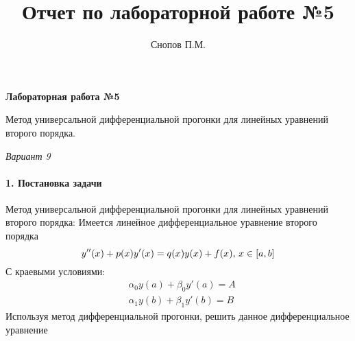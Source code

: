 \documentclass[11pt,a4paper]{report}
\begin{document}
\lstset{
	language=Python,
	tabsize=2,
	showspaces=false,
	showstringspaces=false,
	float=[htb],
	captionpos=b,
	basicstyle=\scriptsize,
	numberblanklines=false,
	breaklines=true
}



\title{Отчет по лабораторной работе №5}

\author{Снопов П.М.}
\thispagestyle{titlepagestyle}
\maketitle
\begin{center}
	\textbf{Лабораторная работа №5}

	Метод универсальной дифференциальной прогонки для линейных уравнений второго порядка.

	\textit{Вариант 9}
\end{center}

\paragraph{1. Постановка задачи}
Метод универсальной дифференциальной прогонки для линейных уравнений второго порядка:
\newline
Имеется линейное дифференциальное уравнение второго порядка 
\[
	y''(x) + p(x)y'(x) = q(x)y(x) + f(x) \text{, $ x \in [a, b] $}
\]
С краевыми условиями:
\[
\begin{aligned}
& \alpha_0y(a) + \beta_0y'(a) = A \\
& \alpha_1y(b) + \beta_1y'(b) = B
\end{aligned}
\]
Используя метод дифференциальной прогонки, решить данное дифференциальное уравнение
\end{document}
